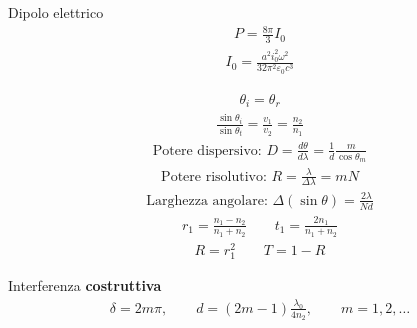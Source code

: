 \documentclass[10pt, twocolumn, a4paper, fleqn]{article}
\def\b{\textbf}
\def\({\left(}
\def\){\right)}
\def\e{\varepsilon}
\def\n{n_}
\begin{document}
Dipolo elettrico
\begin{equation*}\begin{split}
P=\frac{8\pi}{3}I_0
\end{split}\end{equation*}
\begin{equation*}\begin{split}
I_0=\frac{a^2i_0^2\omega ^2}{32\pi^2\e_0c^3}
\end{split}\end{equation*}

\begin{equation*}\begin{split}
\theta_i=\theta_r
\end{split}\end{equation*}
\begin{equation*}\begin{split}
\frac{\sin{\theta_i}}{\sin{\theta_t}}=\frac{v_1}{v_2}=\frac{\n2}{\n1}
\end{split}\end{equation*}
\begin{equation*}\begin{split}
\textrm{Potere dispersivo: }D=\frac{d\theta}{d\lambda}=\frac{1}{d}\frac{m}{\cos{\theta_m}}
\end{split}\end{equation*}
\begin{equation*}\begin{split}
\textrm{Potere risolutivo: }R=\frac{\lambda}{\Delta \lambda}=mN
\end{split}\end{equation*}
\begin{equation*}\begin{split}
\textrm{Larghezza angolare: }\Delta\left(\sin{\theta}\right)=\frac{2\lambda}{Nd}
\end{split}\end{equation*}
\begin{equation*}\begin{split}
r_1=\frac{\n1-\n2}{\n1+\n2} \qquad t_1=\frac{2\n1}{\n1+\n2}
\end{split}\end{equation*}
\begin{equation*}\begin{split}
R=r_1^2 \qquad T=1-R
\end{split}\end{equation*}

Interferenza \b{costruttiva}
\begin{equation*}\begin{split}
\delta=2m\pi, \qquad d=\(2m-1\)\frac{\lambda_0}{4n_2}, \qquad m=1,2,\dots
\end{split}\end{equation*}
\end{document}
